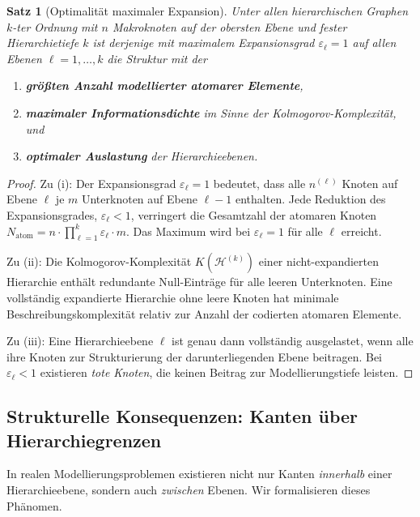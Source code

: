 ﻿\documentclass[12pt,a4paper,twoside]{article}
\theoremstyle{definition}
\theoremstyle{plain}
\newtheorem{theorem}{Satz}[section]
\theoremstyle{remark}
\begin{document}
\begin{theorem}[Optimalität maximaler Expansion]
	\label{thm:optexpansion}
	Unter allen hierarchischen Graphen $k$-ter Ordnung mit $n$ Makroknoten
	auf der obersten Ebene und fester Hierarchietiefe $k$ ist derjenige
	mit maximalem Expansionsgrad $\varepsilon_\ell = 1$ auf allen Ebenen
	$\ell = 1, \ldots, k$ die Struktur mit der
	\begin{enumerate}[label=\textbf{(\roman*)}]
		\item \textbf{größten Anzahl modellierter atomarer Elemente},
		\item \textbf{maximaler Informationsdichte} im Sinne der
		Kolmogorov-Komplexität, und
		\item \textbf{optimaler Auslastung} der Hierarchieebenen.
	\end{enumerate}
\end{theorem}

\begin{proof}
	Zu (i): Der Expansionsgrad $\varepsilon_\ell = 1$ bedeutet, dass alle
	$n^{(\ell)}$ Knoten auf Ebene $\ell$ je $m$ Unterknoten auf Ebene
	$\ell-1$ enthalten.  Jede Reduktion des Expansionsgrades,
	$\varepsilon_\ell < 1$, verringert die Gesamtzahl der atomaren Knoten
	$N_{\text{atom}} = n \cdot \prod_{\ell=1}^{k} \varepsilon_\ell \cdot m$.
	Das Maximum wird bei $\varepsilon_\ell = 1$ für alle $\ell$ erreicht.
	
	Zu (ii): Die Kolmogorov-Komplexität $K(\mathcal{H}^{(k)})$ einer
	nicht-expandierten Hierarchie enthält redundante Null-Einträge für
	alle leeren Unterknoten.  Eine vollständig expandierte Hierarchie
	ohne leere Knoten hat minimale Beschreibungskomplexität relativ zur
	Anzahl der codierten atomaren Elemente.
	
	Zu (iii): Eine Hierarchieebene $\ell$ ist genau dann vollständig
	ausgelastet, wenn alle ihre Knoten zur Strukturierung der darunterliegenden
	Ebene beitragen.  Bei $\varepsilon_\ell < 1$ existieren \emph{tote Knoten},
	die keinen Beitrag zur Modellierungstiefe leisten.\qquad
\end{proof}

\subsection{Strukturelle Konsequenzen: Kanten über Hierarchiegrenzen}
\label{sub:interedges}

In realen Modellierungsproblemen existieren nicht nur Kanten
\emph{innerhalb} einer Hierarchieebene, sondern auch \emph{zwischen}
Ebenen.  Wir formalisieren dieses Phänomen.
\end{document}
